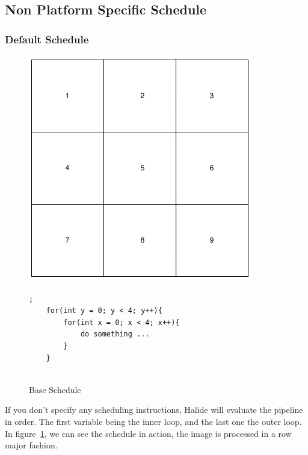 	\subsection{ Non Platform Specific Schedule}

	\subsubsection{Default Schedule}


\begin{figure}[h]
		\begin{minipage}[c]{\EIW}
			\centering
		\includegraphics[width=\textwidth]{Images/BaseOrder.png}
		\end{minipage}
		\begin{minipage}[c]{\ECW}
			\centering
			\begin{lstlisting}[label={code:reorder}];
	for(int y = 0; y < 4; y++){
		for(int x = 0; x < 4; x++){
			do something ...
		}
	}
	
\end{lstlisting}
		\end{minipage}
	\caption{Base Schedule}
	\label{schedule:default}
\end{figure}



	If you don't specify any scheduling instructions, Halide will evaluate the pipeline in order. The first variable being the inner loop, and the last one the outer loop. In figure~\ref{schedule:default}, we can see the schedule in action, the image is processed in a row major fashion.

